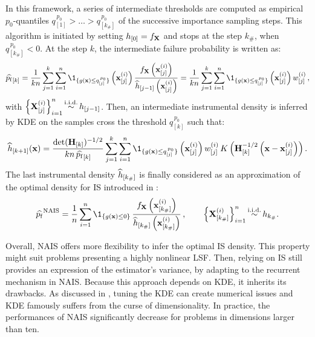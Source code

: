 In this framework, a series of intermediate thresholds are computed as empirical $p_0$-quantiles $q_{[1]}^{\, p_0} > \dots > q_{[k_\#]}^{\, p_0}$ of the successive importance sampling steps. 
This algorithm is initiated by setting $h_{[0]} = f_{\bf X}$ and stops at the step $k_\#$, when  $q_{[k_\#]}^{\, p_0} < 0$.
At the step $k$, the intermediate failure probability is written as: 
\begin{equation}
    \what{\pf}_{[k]} = \frac{1}{k n} \sum_{j=1}^{k} \sum_{i=1}^{n} \1_{\{g(\bx) \leq q_{[j]}^{\, p_0}\}}\left(\bx^{(i)}_{[j]}\right) \frac{f_\bX\left(\bx^{(i)}_{[j]}\right)}{\what{h}_{[j-1]}\left(\bx^{(i)}_{[j]}\right)}
    = \frac{1}{k n} \sum_{j=1}^{k} \sum_{i=1}^{n} \1_{\{g(\bx) \leq q_{[j]}^{\, p_0}\}}\left(\bx^{(i)}_{[j]}\right) w^{(i)}_{[j]} \, , 
\end{equation}
with $\left\{{\bf X}_{[j]}^{(i)}\right\}_{i=1}^n \mathop{\sim}\limits^{\mathrm{i.i.d.}} h_{[j-1]}$. 
Then, an intermediate instrumental density is inferred by KDE on the samples cross the threshold $q_{[k]}^{\, p_0}$ such that:
\begin{equation}
    \what{h}_{[k+1]}(\bx) = \frac{\mathrm{det}(\bH_{[k]})^{-1/2}}{k n \, \what{\pf}_{[k]}} \sum_{j=1}^{k} \sum_{i=1}^{n} 
            \1_{\{g(\bx) \leq q_{[j]}^{\, p_0}\}}\left(\bx^{(i)}_{[j]}\right) w^{(i)}_{[j]} \, K\left(\bH_{[k]}^{-1/2} \left(\bx - \bx^{(i)}_{[j]}\right)\right).
\end{equation} 
The last instrumental density $\widehat{h}_{[k_{\#}]}$ is finally considered as an approximation of the optimal density for IS introduced in : 
\begin{equation}\label{eq:pf_NAIS}
    \what{\pf}^{\mathrm{NAIS}} = \frac1n \sum_{i=1}^{n} \1_{\{g(\bx) \leq 0\}} \,
                                                 \frac{f_\bX\left(\bx^{(i)}_{[k_{\#}]}\right)}{\what{h}_{[k_{\#}]}\left(\bx^{(i)}_{[k_{\#}]}\right)} \, , \qquad
                                                 \left\{\bX_{[k_{\#}]}^{(i)}\right\}_{i=1}^n \simiid h_{k_{\#}}.
\end{equation}

Overall, NAIS offers more flexibility to infer the optimal IS density. 
This property might suit problems presenting a highly nonlinear LSF. 
Then, relying on IS still provides an expression of the estimator's variance, by adapting  to the recurrent mechanism in NAIS. 
Because this approach depends on KDE, it inherits its drawbacks. 
As discussed in \citet{Morio_RESS_2011}, tuning the KDE can create numerical issues and KDE famously suffers from the curse of dimensionality. 
In practice, the performances of NAIS significantly decrease for problems in dimensions larger than ten. 

